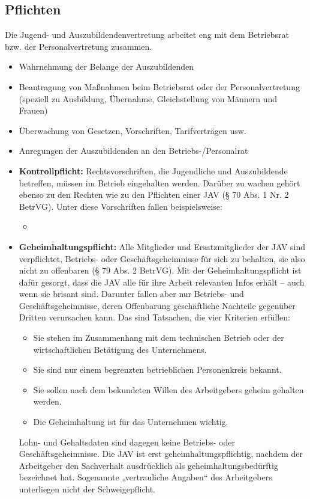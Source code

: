 \subsection{Pflichten}
{
Die Jugend- und Auszubildendenvertretung arbeitet eng mit dem Betriebsrat bzw. der Personalvertretung zusammen. 
}
\newline
\begin{itemize}
	\item  
	Wahrnehmung der Belange der Auszubildenden
	\item
	Beantragung von Maßnahmen beim Betriebsrat oder der Personalvertretung (speziell zu Ausbildung, Übernahme, Gleichstellung von Männern und Frauen)
	\item
	Überwachung von Gesetzen, Vorschriften, Tarifverträgen usw.
	\item
	Anregungen der Auszubildenden an den Betriebs-/Personalrat
	\item
	\textbf{Kontrollpflicht:}
	\newline
	{
		Rechtsvorschriften, die Jugendliche und Auszubildende betreffen, müssen im Betrieb eingehalten werden. \newline 
		Darüber zu wachen gehört ebenso zu den Rechten wie zu den Pflichten einer JAV (§ 70 Abs. 1 Nr. 2 BetrVG). Unter diese Vorschriften fallen beispielsweise:
	}
	\begin{itemize}
		\item 
		
	\end{itemize}
	\item 
	\textbf{Geheimhaltungspflicht:}
	\newline
	{
		Alle Mitglieder und Ersatzmitglieder der JAV sind verpflichtet, Betriebs- oder Geschäftsgeheimnisse für sich zu behalten, sie also nicht zu offenbaren (§ 79 Abs. 2 BetrVG). Mit der Geheimhaltungspflicht ist dafür gesorgt, dass die JAV alle für ihre Arbeit relevanten Infos erhält – auch wenn sie brisant sind.
	 	\newline
	 	Darunter fallen aber nur Betriebs- und Geschäftsgeheimnisse, deren Offenbarung geschäftliche Nachteile gegenüber Dritten verursachen kann. Das sind Tatsachen, die vier Kriterien erfüllen: 
	 }
	\begin{itemize}
		\item 
		Sie stehen im Zusammenhang mit dem technischen Betrieb oder der wirtschaftlichen Betätigung des Unternehmens.
		\item
		Sie sind nur einem begrenzten betrieblichen Personenkreis bekannt.
		\item
		Sie sollen nach dem bekundeten Willen des Arbeitgebers geheim gehalten werden.
		\item
		Die Geheimhaltung ist für das Unternehmen wichtig.
	\end{itemize}
	\newline 
	Lohn- und Gehaltsdaten sind dagegen keine Betriebs- oder Geschäftsgeheimnisse.
	\newline 
	Die JAV ist erst geheimhaltungspflichtig, nachdem der Arbeitgeber den Sachverhalt ausdrücklich als geheimhaltungsbedürftig bezeichnet hat. Sogenannte „vertrauliche Angaben“ des Arbeitgebers unterliegen nicht der Schweigepflicht.
\end{itemize}


